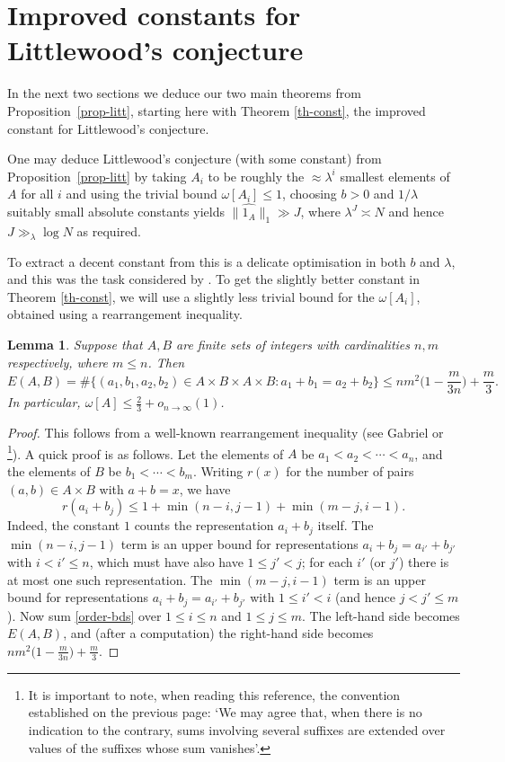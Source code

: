 \documentclass[reqno]{amsart}
\newcommand{\anorm}[1]{\| \widehat{#1}\|}
\renewcommand{\leq}{\leqslant}
\numberwithin{equation}{section}
\newtheorem{lemma}[theorem]{Lemma}
\theoremstyle{definition}
\theoremstyle{remark}
\begin{document}
\section{Improved constants for Littlewood's conjecture}

In the next two sections we deduce our two main theorems from Proposition~\ref{prop-litt}, starting here with Theorem \ref{th-const}, the improved constant for Littlewood's conjecture. 

One may deduce Littlewood's conjecture (with some constant) from Proposition~\ref{prop-litt} by taking $A_i$ to be roughly the $\approx \lambda^{i}$ smallest elements of $A$ for all $i$ and using the trivial bound $\omega[A_i] \leq 1$, choosing $b>0$ and $1/\lambda$ suitably small absolute constants yields $\anorm{1_A}_1\gg J$, where $\lambda^{J}\asymp N$ and hence $J\gg_{\lambda} \log N$ as required.

To extract a decent constant from this is a delicate optimisation in both $b$ and $\lambda$, and this was the task considered by \cite{St82,Ya82}. To get the slightly better constant in Theorem \ref{th-const}, we will use a slightly less trivial bound for the $\omega[A_i]$, obtained using a rearrangement inequality.

\begin{lemma}\label{lem-energy}
Suppose that $A, B$ are finite sets of integers with cardinalities $n,m$ respectively, where $m \leq n$. Then
\[E(A,B) = \# \{ (a_1, b_1, a_2, b_2) \in A \times B \times A \times B : a_1 + b_1 = a_2 + b_2 \}\leq nm^2\big( 1 - \frac{m}{3n}\big) + \frac{m}{3}.\] In particular, $\omega[A] \leq \frac{2}{3} + o_{n \rightarrow \infty}(1)$.
\end{lemma}
\begin{proof}
This follows from a well-known rearrangement inequality (see Gabriel \cite[Theorem 3]{Gabriel} or \cite[Theorem 376]{HLP52}\footnote{It is important to note, when reading this reference, the convention established on the previous page: `We may agree that, when there is no indication to the contrary, sums involving several suffixes are extended over values of the suffixes whose sum vanishes'.}). A quick proof is as follows. Let the elements of $A$ be $a_1 < a_2 < \cdots < a_n$, and the elements of $B$ be $b_1 < \cdots < b_m$. Writing $r(x)$ for the number of pairs $(a,b) \in A \times B$ with $a + b = x$, we have
\begin{equation}\label{order-bds} r(a_i + b_j) \leq 1 + \min(n - i, j - 1) + \min(m - j, i - 1).\end{equation} Indeed, the constant $1$ counts the representation $a_i + b_j$ itself. The $\min(n - i, j - 1)$ term is an upper bound for representations $a_i + b_j = a_{i'} + b_{j'}$ with $i < i' \leq n$, which must have also have $1 \leq j' < j$; for each $i'$ (or $j'$) there is at most one such representation. The $\min(m - j, i - 1)$ term is an upper bound for representations $a_i + b_j = a_{i'} + b_{j'}$ with $1 \leq i' < i$ (and hence $j < j' \leq m$).
Now sum \eqref{order-bds} over $1 \leq i \leq n$ and $1 \leq j \leq m$. The left-hand side becomes $E(A, B)$, and (after a computation) the right-hand side becomes $nm^2\big( 1 - \frac{m}{3n}\big) + \frac{m}{3}$.
\end{proof}
\end{document}
